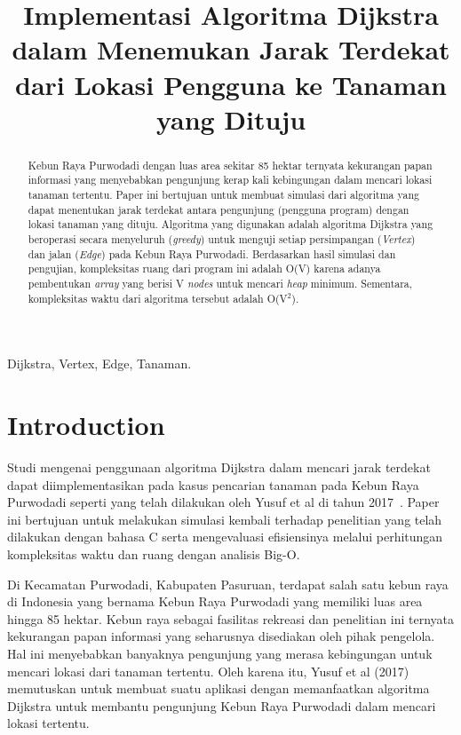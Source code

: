 \documentclass[conference]{IEEEtran}
\title{Implementasi Algoritma Dijkstra dalam Menemukan Jarak Terdekat dari Lokasi Pengguna ke Tanaman yang Dituju}
\author{\IEEEauthorblockN{Muhammad Daris Nurhakim}
\IEEEauthorblockA{\textit{School of Electrical Engineering and Informatics}\\
\textit{Institut Teknologi Bandung}\\
Bandung, Indonesia\\
Email: 13220047@std.stei.itb.ac.id}
}
\begin{document}
\maketitle

\begin{abstract}
Kebun Raya Purwodadi dengan luas area sekitar 85 hektar ternyata kekurangan papan informasi yang menyebabkan pengunjung kerap kali kebingungan dalam mencari lokasi tanaman tertentu. Paper ini bertujuan untuk membuat simulasi dari algoritma yang dapat menentukan jarak terdekat antara pengunjung (pengguna program) dengan lokasi tanaman yang dituju. Algoritma yang digunakan adalah algoritma Dijkstra yang beroperasi secara menyeluruh (\textit{greedy}) untuk menguji setiap persimpangan (\textit{Vertex}) dan jalan (\textit{Edge}) pada Kebun Raya Purwodadi. Berdasarkan hasil simulasi dan pengujian, kompleksitas ruang dari program ini adalah O(V) karena adanya pembentukan \textit{array} yang berisi V \textit{nodes} untuk mencari \textit{heap} minimum. Sementara, kompleksitas waktu dari algoritma tersebut adalah O(V$^2$).
\end{abstract}

\begin{IEEEkeywords}
Dijkstra, Vertex, Edge, Tanaman.
\end{IEEEkeywords}

\section{Introduction}
Studi mengenai penggunaan algoritma Dijkstra dalam mencari jarak terdekat dapat diimplementasikan pada kasus pencarian tanaman pada Kebun Raya Purwodadi seperti yang telah dilakukan oleh Yusuf et al di tahun 2017~\cite{yusuf2017implementasi}. Paper ini bertujuan untuk melakukan simulasi kembali terhadap penelitian yang telah dilakukan dengan bahasa C serta mengevaluasi efisiensinya melalui perhitungan kompleksitas waktu dan ruang dengan analisis Big-O.

Di Kecamatan Purwodadi, Kabupaten Pasuruan, terdapat salah satu kebun raya di Indonesia yang bernama Kebun Raya Purwodadi yang memiliki luas area hingga 85 hektar. Kebun raya sebagai fasilitas rekreasi dan penelitian ini ternyata kekurangan papan informasi yang seharusnya disediakan oleh pihak pengelola. Hal ini menyebabkan banyaknya pengunjung yang merasa kebingungan untuk mencari lokasi dari tanaman tertentu. Oleh karena itu, Yusuf et al (2017) memutuskan untuk membuat suatu aplikasi dengan memanfaatkan algoritma Dijkstra untuk membantu pengunjung Kebun Raya Purwodadi dalam mencari lokasi tertentu.
\end{document}

